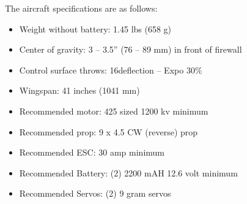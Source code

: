 The aircraft specifications are as follows:
\begin{itemize}
	\item Weight without battery: 1.45 lbs (658 g)
	\item Center of gravity: 3 – 3.5” (76 – 89 mm) in front of firewall
	\item Control surface throws: 16\degrees  deflection – Expo 30\%
	\item Wingspan: 41 inches (1041 mm)
	\item Recommended motor: 425 sized 1200 kv minimum
	\item Recommended prop: 9 x 4.5 CW (reverse) prop
	\item Recommended ESC: 30 amp minimum
	\item Recommended Battery: (2) 2200 mAH 12.6 volt minimum
	\item Recommended Servos: (2) 9 gram servos 
\end{itemize}



